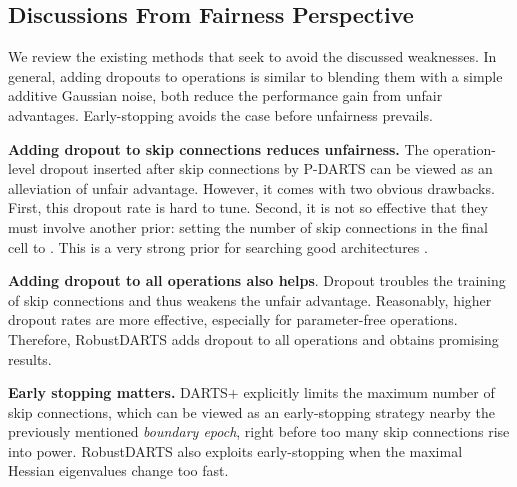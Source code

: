 \documentclass[runningheads]{llncs}
\begin{document}
\subsection{Discussions From Fairness Perspective}\label{sec:discussion}

We review the existing methods that seek to avoid the discussed weaknesses. In general, adding dropouts  \cite{chen2019progressive,zela2020understanding} to operations is similar to blending them with a simple additive Gaussian noise, both reduce the performance gain from unfair advantages. Early-stopping \cite{liang2019darts} avoids the case before unfairness prevails.



\textbf{Adding dropout to skip connections reduces unfairness.}
The operation-level dropout \cite{srivastava2014dropout} inserted after skip connections by P-DARTS \cite{chen2019progressive} can be viewed as an alleviation of unfair advantage.  However, it comes with two obvious drawbacks. First, this dropout rate is hard to tune. Second, it is not so effective that they must involve another prior: setting the number of skip connections in the final cell to . This is a very strong prior for searching good architectures \cite{liang2019darts}. 

\textbf{Adding dropout to all operations also helps}. Dropout troubles the training of skip connections and thus weakens the unfair advantage. Reasonably, higher dropout rates are more effective, especially for parameter-free operations. Therefore, RobustDARTS \cite{zela2020understanding} adds dropout to all operations and obtains promising results. 





\textbf{Early stopping matters.}
DARTS+ \cite{liang2019darts} explicitly limits the maximum number of skip connections, which can be viewed as an early-stopping strategy nearby the previously mentioned \emph{boundary epoch}, right before too many skip connections rise into power. RobustDARTS \cite{zela2020understanding} also exploits early-stopping when the maximal Hessian eigenvalues change too fast.
\end{document}
